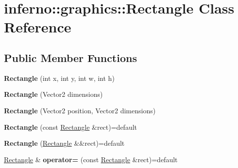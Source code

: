 \hypertarget{classinferno_1_1graphics_1_1_rectangle}{}\section{inferno\+:\+:graphics\+:\+:Rectangle Class Reference}
\label{classinferno_1_1graphics_1_1_rectangle}
\subsection*{Public Member Functions}
\begin{DoxyCompactItemize}
\item 
\mbox{\label{classinferno_1_1graphics_1_1_rectangle_a6abc478421b60e8549d44a2640aba2e8}} 
{\bfseries Rectangle} (int x, int y, int w, int h)
\item 
\mbox{\label{classinferno_1_1graphics_1_1_rectangle_a814df936f602eadf641dc5ac323b6408}} 
{\bfseries Rectangle} (Vector2 dimensions)
\item 
\mbox{\label{classinferno_1_1graphics_1_1_rectangle_a86d6d0d63fc14106594210473037255a}} 
{\bfseries Rectangle} (Vector2 position, Vector2 dimensions)
\item 
\mbox{\label{classinferno_1_1graphics_1_1_rectangle_ad4a2b10b3b75379efcc808bc7be1d855}} 
{\bfseries Rectangle} (const \mbox{\hyperlink{classinferno_1_1graphics_1_1_rectangle}{Rectangle}} \&rect)=default
\item 
\mbox{\label{classinferno_1_1graphics_1_1_rectangle_a82d817bb84990a7e4099f3a92892c283}} 
{\bfseries Rectangle} (\mbox{\hyperlink{classinferno_1_1graphics_1_1_rectangle}{Rectangle}} \&\&rect)=default
\item 
\mbox{\label{classinferno_1_1graphics_1_1_rectangle_abf9f5dfa2c99428262efbdf579e7a12d}} 
\mbox{\hyperlink{classinferno_1_1graphics_1_1_rectangle}{Rectangle}} \& {\bfseries operator=} (const \mbox{\hyperlink{classinferno_1_1graphics_1_1_rectangle}{Rectangle}} \&rect)=default
\item 

\end{DoxyCompactItemize}
